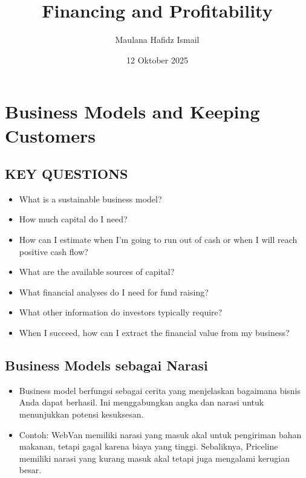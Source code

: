 \documentclass{article}
\title{Financing and Profitability}
\date{12 Oktober 2025}
\author{Maulana Hafidz Ismail}
\begin{document}
\maketitle
\newpage

\tableofcontents
\newpage
{}

\section{Business Models and Keeping Customers}

\subsection{KEY QUESTIONS}
\begin{itemize}
    \item What is a sustainable business model?
    \item How much capital do I need?
    \item How can I estimate when I'm going to run out of cash  or when I will reach positive cash flow?
    \item What are the available sources of capital?
    \item What financial analyses do I need for fund raising?
    \item What other information do investors typically require?
    \item When I succeed, how can I extract the financial value from my business?
\end{itemize}

\subsection{Business Models sebagai Narasi}
\begin{itemize}
    \item Business model berfungsi sebagai cerita yang menjelaskan bagaimana bisnis Anda dapat berhasil. Ini menggabungkan angka dan narasi untuk menunjukkan potensi kesuksesan.
    \item Contoh: WebVan memiliki narasi yang masuk akal untuk pengiriman bahan makanan, tetapi gagal karena biaya yang tinggi. Sebaliknya, Priceline memiliki narasi yang kurang masuk akal tetapi juga mengalami kerugian besar.
\end{itemize}
\end{document}

